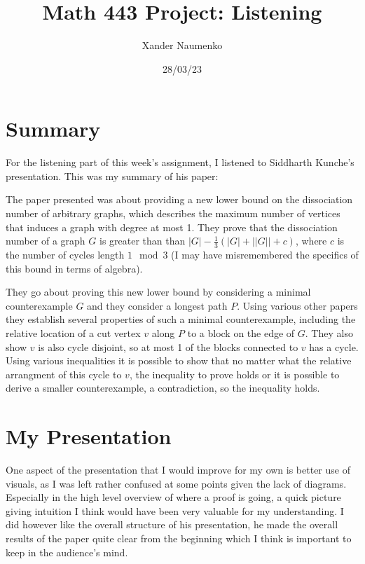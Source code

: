 \documentclass[letterpaper, reqno,11pt]{article}
\begin{document}
\title{Math 443 Project: Listening}
\date{28/03/23}
\author{Xander Naumenko}
\maketitle

\section{Summary}

For the listening part of this week's assignment, I listened to Siddharth Kunche's presentation. This was my summary of his paper:

\medskip

The paper presented was about providing a new lower bound on the dissociation number of arbitrary graphs, which describes the maximum number of vertices that induces a graph with degree at most 1. They prove that the dissociation number of a graph $G$ is greater than than $|G|-\frac{1}{3}(|G|+||G||+c)$, where $c$ is the number of cycles length $1\mod 3$ (I may have misremembered the specifics of this bound in terms of algebra).

They go about proving this new lower bound by considering a minimal counterexample $G$ and they consider a longest path $P$. Using various other papers they establish several properties of such a minimal counterexample, including the relative location of a cut vertex $v$ along $P$ to a block on the edge of $G$. They also show $v$ is also cycle disjoint, so at most 1 of the blocks connected to $v$ has a cycle. Using various inequalities it is possible to show that no matter what the relative arrangment of this cycle to $v$, the inequality to prove holds or it is possible to derive a smaller counterexample, a contradiction, so the inequality holds. 

\section{My Presentation}

One aspect of the presentation that I would improve for my own is better use of visuals, as I was left rather confused at some points given the lack of diagrams. Especially in the high level overview of where a proof is going, a quick picture giving intuition I think would have been very valuable for my understanding. I did however like the overall structure of his presentation, he made the overall results of the paper quite clear from the beginning which I think is important to keep in the audience's mind.
\end{document}
